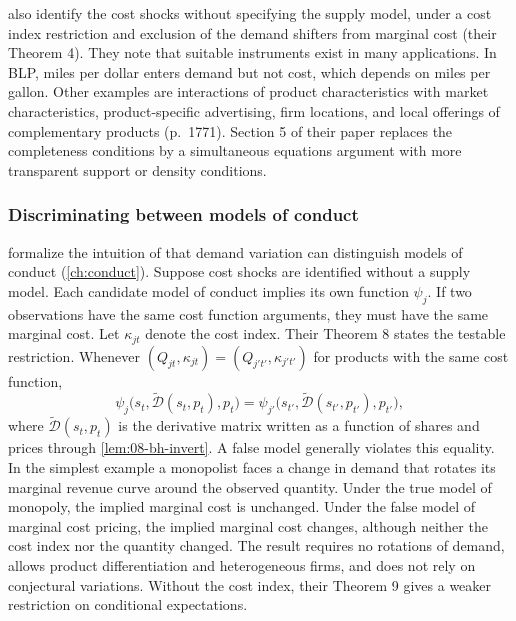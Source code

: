 \citet[Section 4.4]{BerryHaile2014} also identify the cost shocks without specifying the supply model, under a
cost index restriction and exclusion of the demand shifters from marginal cost (their Theorem 4). They note that
suitable instruments exist in many applications. In BLP, miles per dollar enters demand but not cost, which
depends on miles per gallon. Other examples are interactions of product characteristics with market
characteristics, product-specific advertising, firm locations, and local offerings of complementary products
(p.~1771). Section 5 of their paper replaces the completeness conditions by a simultaneous equations argument
with more transparent support or density conditions.

\subsubsection{Discriminating between models of conduct}

\citet[Section 6]{BerryHaile2014} formalize the intuition of \citet{Bresnahan1982} that demand variation can
distinguish models of conduct (\cref{ch:conduct}). Suppose cost shocks are identified without a supply model.
Each candidate model of conduct implies its own function $\psi_j$. If two observations have the same cost
function arguments, they must have the same marginal cost. Let $\kappa_{jt}$ denote the cost index. Their
Theorem 8 states the testable restriction. Whenever $(Q_{jt}, \kappa_{jt}) = (Q_{j't'}, \kappa_{j't'})$ for
products with the same cost function,
\begin{equation*}
  \psi_j\big(s_t, \tilde{\mathcal{D}}(s_t, p_t), p_t\big) = \psi_{j'}\big(s_{t'}, \tilde{\mathcal{D}}(s_{t'},
  p_{t'}), p_{t'}\big),
\end{equation*}
where $\tilde{\mathcal{D}}(s_t, p_t)$ is the derivative matrix written as a function of shares and prices
through \cref{lem:08-bh-invert}. A false model generally violates this equality. In the simplest example a
monopolist faces a change in demand that rotates its marginal revenue curve around the observed quantity.
Under the true model of monopoly, the implied marginal cost is unchanged. Under the false model of marginal
cost pricing, the implied marginal cost changes, although neither the cost index nor the quantity changed. The
result requires no rotations of demand, allows product differentiation and heterogeneous firms, and does not
rely on conjectural variations. Without the cost index, their Theorem 9 gives a weaker restriction on conditional
expectations.

